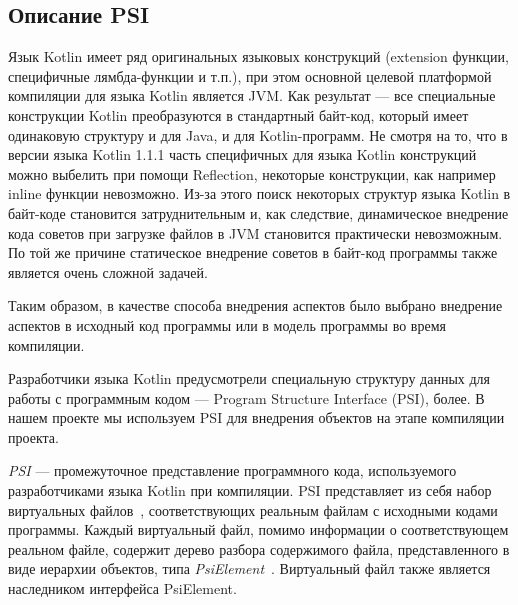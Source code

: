 \subsection{Описание PSI}
\label{sub:psi_description}
Язык Kotlin имеет ряд оригинальных языковых конструкций (extension функции,
специфичные лямбда-функции и т.п.), при этом основной целевой платформой
компиляции для языка Kotlin является JVM.
Как результат --- все специальные конструкции Kotlin преобразуются в стандартный
байт-код, который имеет одинаковую структуру и для Java, и для Kotlin-программ.
Не смотря на то, что в версии языка Kotlin 1.1.1 часть специфичных для языка
Kotlin конструкций можно выбелить при помощи Reflection, некоторые конструкции,
как например inline функции невозможно.
Из-за этого поиск некоторых структур языка Kotlin в байт-коде становится
затруднительным и, как следствие, динамическое внедрение кода советов при
загрузке файлов в JVM становится практически невозможным.
По той же причине статическое внедрение советов в байт-код программы также
является очень сложной задачей.

Таким образом, в качестве способа внедрения аспектов было выбрано внедрение аспектов в исходный код программы или в модель программы во время компиляции. 

Разработчики языка Kotlin предусмотрели специальную структуру данных для работы
с программным кодом --- Program Structure Interface (PSI), более.
В нашем проекте мы используем PSI для внедрения объектов на этапе компиляции
проекта.

\textit{PSI} --- промежуточное представление программного кода, используемого
разработчиками языка Kotlin при компиляции.
PSI представляет из себя набор виртуальных файлов~\cite{psi_file},
соответствующих реальным файлам с исходными кодами программы.
Каждый виртуальный файл, помимо информации о соответствующем реальном файле,
содержит дерево разбора содержимого файла, представленного в виде иерархии
объектов, типа \textit{PsiElement}~\cite{psi_element}.
Виртуальный файл также является наследником интерфейса PsiElement.
